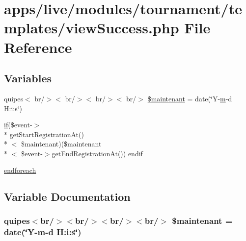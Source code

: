 \hypertarget{live_2modules_2tournament_2templates_2view_success_8php}{\section{apps/live/modules/tournament/templates/view\-Success.php File Reference}
\label{live_2modules_2tournament_2templates_2view_success_8php}
}
\subsection*{Variables}
\begin{DoxyCompactItemize}
\item 
quipes$<$ br/$>$$<$ br/$>$$<$ br/$>$$<$ br/$>$ \hyperlink{live_2modules_2tournament_2templates_2view_success_8php_ab4ab6dabf2fa9ecac01d080d46257efe}{\$maintenant} = date(\char`\"{}Y-\/\hyperlink{frontend_2modules_2poker__tournament_2templates_2view_success_8php_a128ba33893be6a113de6d7895ff5d641}{m}-\/d H\-:i\-:s\char`\"{})
\item 
\hyperlink{live_2modules_2tournament_2templates_2__form_team_8php_ae30a307b320d8da5d9a945eaf68f7549}{if}(\$event-\/$>$\\*
get\-Start\-Registration\-At()\\*
$<$ \$maintenant)(\$maintenant\\*
$<$ \$event-\/$>$get\-End\-Registration\-At()) \hyperlink{live_2modules_2tournament_2templates_2view_success_8php_a6a4e0258f03fd41cbc37d46e04b7be7f}{endif}
\item 
\hyperlink{live_2modules_2tournament_2templates_2view_success_8php_a672d9707ef91db026c210f98cc601123}{endforeach}
\end{DoxyCompactItemize}


\subsection{Variable Documentation}
\hypertarget{live_2modules_2tournament_2templates_2view_success_8php_ab4ab6dabf2fa9ecac01d080d46257efe}{
\subsubsection[{\$maintenant}]{\setlength{\rightskip}{0pt plus 5cm}quipes$<$br/$>$$<$br/$>$$<$br/$>$$<$br/$>$ \$maintenant = date(\char`\"{}Y-\/{\bf m}-\/d H\-:i\-:s\char`\"{})}}\label{live_2modules_2tournament_2templates_2view_success_8php_ab4ab6dabf2fa9ecac01d080d46257efe}


